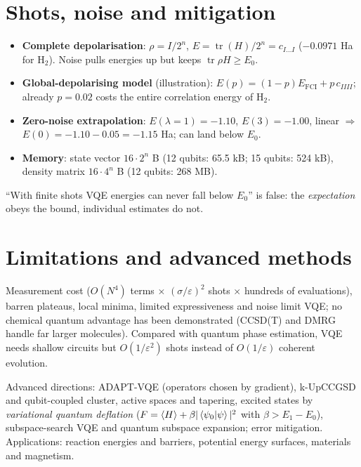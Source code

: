 \documentclass[11pt,a4paper,openany]{book}
\begin{document}
\section{Shots, noise and mitigation}
\begin{itemize}
\item \textbf{Complete depolarisation}: $\rho = I/2^n$, $E = \operatorname{tr}(H)/2^n = c_{I\dots I}$ ($-0.0971$ Ha for H$_2$). Noise pulls energies up but keeps $\operatorname{tr}\rho H \ge E_0$.
\item \textbf{Global-depolarising model} (illustration): $E(p) = (1 - p)E_{\mathrm{FCI}} + p\,c_{IIII}$; already $p = 0.02$ costs the entire correlation energy of H$_2$.
\item \textbf{Zero-noise extrapolation}: $E(\lambda{=}1) = -1.10$, $E(3) = -1.00$, linear $\Rightarrow$ $E(0) = -1.10 - 0.05 = -1.15$ Ha; can land below $E_0$.
\item \textbf{Memory}: state vector $16\cdot2^n$ B (12 qubits: 65.5 kB; 15 qubits: 524 kB), density matrix $16\cdot4^n$ B (12 qubits: 268 MB).
\end{itemize}
\begin{trap}
``With finite shots VQE energies can never fall below $E_0$'' is false: the \emph{expectation} obeys the bound, individual estimates do not.
\end{trap}

\section{Limitations and advanced methods}
Measurement cost ($O(N^4)$ terms $\times$ $(\sigma/\varepsilon)^2$ shots $\times$ hundreds of evaluations), barren plateaus, local minima, limited expressiveness and
noise limit VQE; no chemical quantum advantage has been demonstrated (CCSD(T) and DMRG handle far larger molecules). Compared with
quantum phase estimation, VQE needs shallow circuits but $O(1/\varepsilon^2)$ shots instead of $O(1/\varepsilon)$ coherent evolution.

Advanced directions: ADAPT-VQE (operators chosen by gradient), k-UpCCGSD and qubit-coupled cluster, active spaces and tapering, excited
states by \emph{variational quantum deflation} ($F = \braket H + \beta|\braket{\psi_0|\psi}|^2$ with $\beta > E_1 - E_0$), subspace-search VQE and quantum subspace
expansion; error mitigation. Applications: reaction energies and barriers, potential energy surfaces, materials and magnetism.
\end{document}
